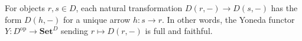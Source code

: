 For objects $r, s \in D$, each natural transformation $D(r, -) \to D(s, -)$ has the form $D(h, -)$ for a unique arrow $h: s \to r$. In other words, the Yoneda functor $Y: D^{\mathrm{op}} \to \mathbf{Set}^D$ sending $r \mapsto D(r, -)$ is full and faithful.